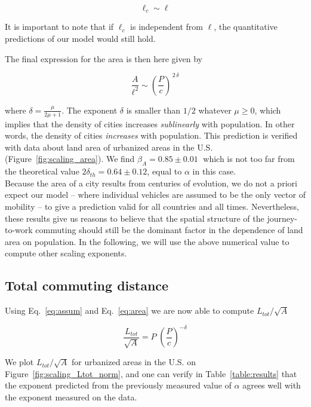 \begin{equation}
    \ell_c \sim \ell
\end{equation}

It is important to note that if $\ell_c$ is independent from $\ell$, the
quantitative predictions of our model would still hold. 

The final expression for the area is then here given by

\begin{equation}
    \frac{A}{\ell^2} \sim \left( \frac{P}{c} \right)^{\,2\,\delta}
    \label{eq:area}
\end{equation}

where $\delta=\frac{\mu}{2\mu+1}$. The exponent $\delta$ is smaller than $1/2$
whatever $\mu\geq 0$, which implies that the density of cities increases
\emph{sublinearly} with population. In other words, the density of cities
\emph{increases}  with population. This prediction is verified with data about
land area of urbanized areas in the U.S. (Figure~\ref{fig:scaling_area}). We find
$\beta_A = 0.85 \pm 0.01\;$ which is not too far from the
theoretical value $2\delta_{th} = 0.64 \pm 0.12$, equal to
$\alpha$ in this case.\\

Because the area of a city results from centuries of evolution, we do
not a priori expect our model -- where individual vehicles are assumed to be the
only vector of mobility -- to give a prediction valid for all countries and all
times. Nevertheless, these results give us reasons to believe that the spatial
structure of the journey-to-work commuting should still be the dominant factor
in the dependence of land area on population. In the following, we will use the
above numerical value to compute other scaling exponents.


\subsection{Total commuting distance}

Using Eq.~\ref{eq:assum} and Eq.~\ref{eq:area} we are now able to compute $L_{tot}/\sqrt{A}$

\begin{equation}
    \frac{L_{tot}}{\sqrt{A}} = P\; \left(\frac{P}{c}\right)^{-\delta}
    \label{eq:travelled_length}
\end{equation}

We plot $L_{tot} / \sqrt{A}$ for urbanized areas in the U.S. on
Figure~\ref{fig:scaling_Ltot_norm}, and one
can verify in Table~\ref{table:results} that the exponent predicted from the previously measured
value of $\alpha$ agrees well with the exponent measured on the data.


